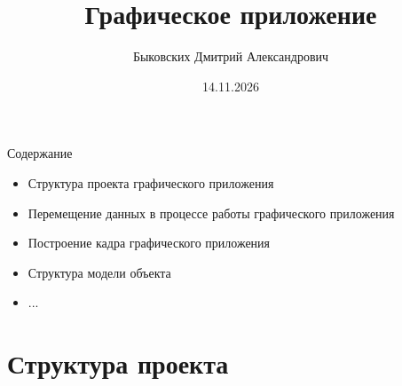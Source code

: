 \documentclass{beamer}
\title[Графическое приложение]{Графическое приложение}
\author[Быковских Д.А.]{Быковских Дмитрий Александрович}
\date{14.11.2026}
\begin{document}
\begin{frame}
	\titlepage
\end{frame}

\begin{frame}{Содержание}
	\begin{itemize}
		\item Структура проекта графического приложения
		\item Перемещение данных в процессе работы графического приложения
		\item Построение кадра графического приложения
		\item Структура модели объекта
		\item ...
	\end{itemize}
\end{frame}

\section{Структура проекта}
\end{document}
